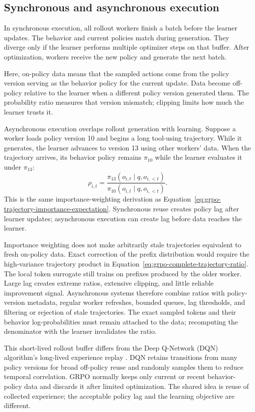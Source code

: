 \subsection{Synchronous and asynchronous execution}

In synchronous execution, all rollout workers finish a batch before the learner updates.
The behavior and current policies match during generation. They diverge only if the
learner performs multiple optimizer steps on that buffer. After optimization, workers
receive the new policy and generate the next batch.

Here, on-policy data means that the sampled actions come from the policy version serving
as the behavior policy for the current update. Data become off-policy relative to the
learner when a different policy version generated them. The probability ratio measures
that version mismatch; clipping limits how much the learner trusts it.

Asynchronous execution overlaps rollout generation with learning. Suppose a worker loads
policy version 10 and begins a long tool-using trajectory. While it generates, the learner
advances to version 13 using other workers' data. When the trajectory arrives, its
behavior policy remains $\pi_{10}$ while the learner evaluates it under $\pi_{13}$:
\begin{equation}
  \rho_{i,t}
  =\frac{\pi_{13}(o_{i,t}\mid q,o_{i,<t})}
         {\pi_{10}(o_{i,t}\mid q,o_{i,<t})}.
  \label{eq:grpo-asynchronous-ratio}
\end{equation}
This is the same importance-weighting derivation as
Equation~\ref{eq:grpo-trajectory-importance-expectation}. Synchronous reuse creates policy
lag after learner updates; asynchronous execution can create lag before data reaches the
learner.

Importance weighting does not make arbitrarily stale trajectories equivalent to fresh
on-policy data. Exact correction of the prefix distribution would require the high-variance
trajectory product in Equation~\ref{eq:grpo-complete-trajectory-ratio}. The local token
surrogate still trains on prefixes produced by the older worker. Large lag creates extreme
ratios, extensive clipping, and little reliable improvement signal. Asynchronous systems
therefore combine ratios with policy-version metadata, regular worker refreshes, bounded
queues, lag thresholds, and filtering or rejection of stale trajectories. The exact
sampled tokens and their behavior log-probabilities must remain attached to the data;
recomputing the denominator with the learner invalidates the ratio.

This short-lived rollout buffer differs from the Deep Q-Network (DQN) algorithm's
long-lived experience replay \citep{mnih2015dqn}. DQN retains transitions from many policy versions for broad
off-policy reuse and randomly samples them to reduce temporal correlation. GRPO normally
keeps only current or recent behavior-policy data and discards it after limited
optimization. The shared idea is reuse of collected experience; the acceptable policy lag
and the learning objective are different.
